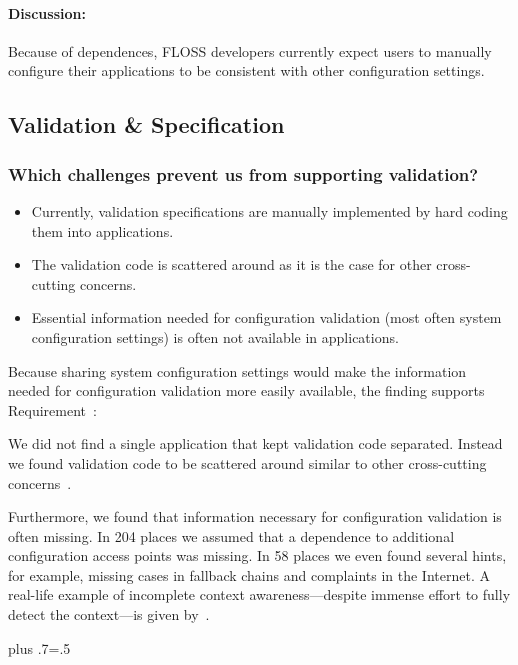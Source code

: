 \paragraph{Discussion:}
Because of dependences, FLOSS developers currently expect users to manually configure their applications to be consistent with other configuration settings.

\subsection{Validation \& Specification}

\subsubsection{Which challenges prevent us from supporting validation?}

\begin{finding}
\fixtheorem
\begin{itemize}
\item
Currently, validation specifications are manually implemented by hard coding them into applications.
\item
The validation code is scattered around as it is the case for other cross-cutting concerns.
\item
Essential information needed for configuration validation (most often system configuration settings) is often not available in applications.
\end{itemize}
\end{finding}

Because sharing system configuration settings would make the information needed for configuration validation more easily available, the finding supports Requirement~:
\reqSharing*

\methodSource{}
We did not find a single application that kept validation code separated.
Instead we found validation code to be scattered around similar to other cross-cutting concerns~\cite{raab2017challenges}.

Furthermore, we found that information necessary for configuration validation is often missing.
In 204 places we assumed that a dependence to additional configuration access points was missing.
In 58 places we even found several hints, for example, missing cases in fallback chains and complaints in the Internet.
A real-life example of incomplete context awareness---despite immense effort to fully detect the context---is given by~\citet{raab2017challenges}.%
{\parfillskip=0pt plus .7\textwidth \emergencystretch=.5\textwidth \par}

